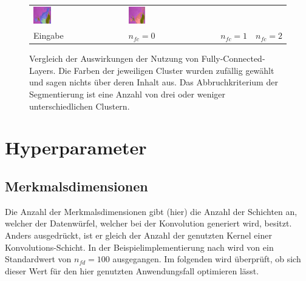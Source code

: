 \begin{figure}[h!]
\begin{tabular}{C{0.24\textwidth}C{0.24\textwidth}C{0.24\textwidth}C{0.24\textwidth}}
		\includegraphics[width=0.2\textwidth]{images/gen/fully_connected/p03_04.png_1.png} &
		\includegraphics[width=0.2\textwidth]{images/gen/fully_connected/p03_04.png_2.png} \\
		
		\hspace{2pt}\newline\centering Eingabe & 
		\hspace{2pt}\newline\centering $n_{fc}=0$ &
		\hspace{2pt}\newline\centering $n_{fc}=1$ &
		\hspace{2pt}\newline\centering $n_{fc}=2$ 
	\end{tabular}
	\caption{Vergleich der Auswirkungen der Nutzung von Fully-Connected-Layers. Die Farben der jeweiligen Cluster wurden zufällig gewählt und sagen nichts über deren Inhalt aus. Das Abbruchkriterium der Segmentierung ist eine Anzahl von drei oder weniger unterschiedlichen Clustern.}
	\label{fig:fc_comparision}
\end{figure}

\section{Hyperparameter}
\label{sec:hyperparameter}

\iffalse\subsection{Merkmalsdimensionen}

Die Anzahl der Merkmalsdimensionen gibt (hier) die Anzahl der Schichten an, welcher der Datenwürfel, welcher bei der Konvolution generiert wird, besitzt. Anders ausgedrückt, ist er gleich der Anzahl der genutzten Kernel einer Konvolutions-Schicht. In der Beispielimplementierung nach \cite{kanezaki_18} wird von ein Standardwert von $n_{fd} = 100$ ausgegangen. Im folgenden wird überprüft, ob sich dieser Wert für den hier genutzten Anwendungsfall optimieren lässt.

